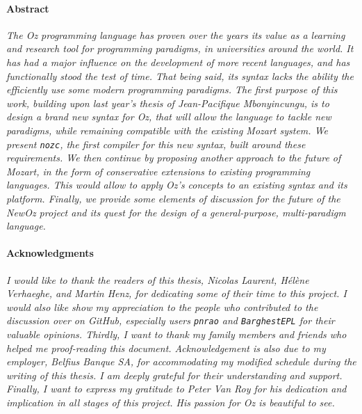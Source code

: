 \paragraph{Abstract}
\textit{
The \textit{Oz} programming language has proven over the years its value as a learning and research tool for programming paradigms, in universities around the world.
It has had a major influence on the development of more recent languages, and has functionally stood the test of time.
That being said, its syntax lacks the ability the efficiently use some modern programming paradigms.
The first purpose of this work, building upon last year's thesis of Jean-Pacifique Mbonyincungu, is to design a brand new syntax for \textit{Oz}, that will allow the language to tackle new paradigms, while remaining compatible with the existing Mozart system.
We present \texttt{nozc}, the first compiler for this new syntax, built around these requirements.
We then continue by proposing another approach to the future of Mozart, in the form of conservative extensions to existing programming languages.
This would allow to apply \textit{Oz}'s concepts to an existing syntax and its platform.
Finally, we provide some elements of discussion for the future of the \textit{NewOz} project and its quest for the design of a general-purpose, multi-paradigm language.
}
\vfill
\paragraph{Acknowledgments}
\textit{
I would like to thank the readers of this thesis, Nicolas Laurent, Hélène Verhaeghe, and Martin Henz, for dedicating some of their time to this project.\newline
I would also like show my appreciation to the people who contributed to the discussion over on \emph{GitHub}, especially users \texttt{pnrao} and \texttt{BarghestEPL} for their valuable opinions.\newline
Thirdly, I want to thank my family members and friends who helped me proof-reading this document.\newline
Acknowledgement is also due to my employer, \emph{Belfius Banque SA}, for accommodating my modified schedule during the writing of this thesis. I am deeply grateful for their understanding and support.\newline
Finally, I want to express my gratitude to Peter Van Roy for his dedication and implication in all stages of this project. His passion for \emph{Oz} is beautiful to see.
}
